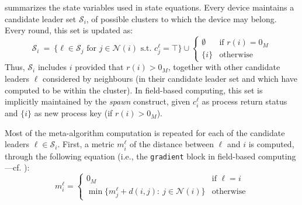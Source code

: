 summarizes the state variables used in state equations.
 Every device maintains a candidate leader set $\mathcal{S}_i$, of possible clusters to which the device may belong. Every round, this set is updated as:
\[
\mathcal{S}_i ~=~ \{ \ell \in \mathcal{S}_j \text{ for } j \in \mathcal{N}(i) \text{ s.t. } c^\ell_j = \top \} \cup \begin{cases}
	\emptyset & \text{if } r(i) = 0_M \\
	\{ i \} & \text{otherwise}
\end{cases}
\]
Thus, $\mathcal{S}_i$ includes $i$ provided that $r(i) > 0_M$, together with other candidate leaders $\ell$ considered by neighbours
 (in their candidate leader set and which have computed to be within the cluster).
 In field-based computing, this set is implicitly maintained by the \emph{spawn} construct,
 given $c^\ell_i$ as process return status and $\{ i \}$ as new process key (if $r(i) > 0_M$).

Most of the meta-algorithm computation is repeated for each of the candidate leaders $\ell \in \mathcal{S}_i$. First, a metric $m^\ell_i$ of the distance between $\ell$ and $i$ is computed,
 through the following equation (i.e., the \lstinline|gradient| block in field-based computing---cf. ):
\[
m^\ell_i = \begin{cases}
	0_M & \text{if } \ell = i \\
	\min \{m^\ell_j + d(i,j) : ~ j \in \mathcal{N}(i) \} & \text{otherwise}
\end{cases}
\]

